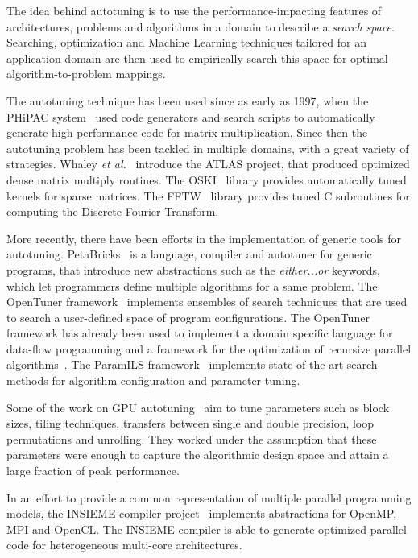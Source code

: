 \documentclass[a4paper, 12pt]{article}
\begin{document}
The idea behind autotuning is to use the performance-impacting features 
of architectures, problems and algorithms in a domain to describe
a \emph{search space}. Searching, optimization and Machine Learning techniques
tailored for an application domain are then used to empirically
search this space for optimal algorithm-to-problem mappings.

The autotuning technique has been used since as early as 1997, when the PHiPAC
system~\cite{bilmes1997phipac} used code generators and search scripts to
automatically generate high performance code for matrix multiplication. Since
then the autotuning problem has been tackled in multiple domains, with a great
variety of strategies. Whaley \emph{et al.}~\cite{whaley1998atlas} introduce the
ATLAS project, that produced optimized dense matrix multiply routines. The
OSKI~\cite{vuduc2005oski} library provides automatically tuned kernels for
sparse matrices. The FFTW~\cite{frigo1998fftw} library provides tuned C
subroutines for computing the Discrete Fourier Transform.

More recently, there have been efforts in the implementation of generic tools
for autotuning. PetaBricks~\cite{ansel2009petabricks} is a language, compiler
and autotuner for generic programs, that introduce new abstractions such as the
\emph{either...or} keywords, which let programmers define multiple algorithms
for a same problem. The OpenTuner framework~\cite{ansel2014opentuner} implements
ensembles of search techniques that are used to search a user-defined space of
program configurations. The OpenTuner framework has already been used to
implement a domain specific language for data-flow programming
\cite{bosboom2014streamjit} and a framework for the optimization of recursive
parallel algorithms~\cite{eliahu2015frpa}. The ParamILS
framework~\cite{hutter2009paramils} implements state-of-the-art search methods
for algorithm configuration and parameter tuning.

Some of the work on GPU autotuning~\cite{guo2010autotuningCUDA,
dongarra2009note,grauer2012autotuningHLLGPU} aim to tune parameters such as block
sizes, tiling techniques, transfers between single and double precision, loop
permutations and unrolling. They worked under the assumption that these
parameters were enough to capture the algorithmic design space and attain a
large fraction of peak performance.

In an effort to provide a common representation of multiple parallel
programming models, the INSIEME compiler project~\cite{jordan2012multi}
implements abstractions for OpenMP, MPI and OpenCL. The INSIEME compiler is
able to generate optimized parallel code for heterogeneous multi-core
architectures.
\end{document}

